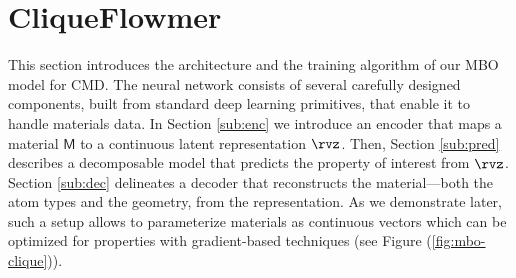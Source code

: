 \documentclass{article}
\theoremstyle{plain}
\theoremstyle{definition}
\theoremstyle{remark}
\begin{document}
\section{CliqueFlowmer}
\vspace{-5pt}
This section introduces the architecture and the training algorithm of our MBO model for CMD. 
The neural network consists of several carefully designed components, built from standard deep learning primitives, that enable it to handle materials data.
In Section \ref{sub:enc} we introduce an encoder that maps a material $\mathsf{M}$ to a continuous latent representation $\rvz$.
Then, Section \ref{sub:pred} describes a decomposable model that predicts the property of interest from $\rvz$.  
Section \ref{sub:dec} delineates a decoder that reconstructs the material---both the atom types and the geometry, from the representation.
As we demonstrate later, such a setup allows to parameterize materials as continuous vectors which can be optimized for properties with gradient-based techniques (see Figure (\ref{fig:mbo-clique})).


\vspace{-5pt}
\end{document}
